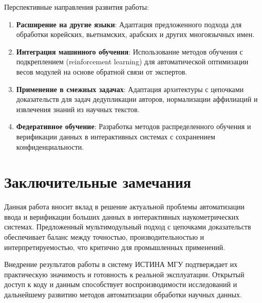 Перспективные направления развития работы:

\begin{enumerate}
    \item \textbf{Расширение на другие языки}: Адаптация предложенного подхода для обработки корейских, вьетнамских, арабских и других многоязычных имен.

    \item \textbf{Интеграция машинного обучения}: Использование методов обучения с подкреплением (reinforcement learning) для автоматической оптимизации весов модулей на основе обратной связи от экспертов.

    \item \textbf{Применение в смежных задачах}: Адаптация архитектуры с цепочками доказательств для задач дедупликации авторов, нормализации аффилиаций и извлечения знаний из научных текстов.

    \item \textbf{Федеративное обучение}: Разработка методов распределенного обучения и верификации данных в интерактивных системах с сохранением конфиденциальности.
\end{enumerate}

\section{Заключительные замечания}
\label{sec:concl:final}

Данная работа вносит вклад в решение актуальной проблемы автоматизации ввода и верификации больших данных в интерактивных наукометрических системах. Предложенный мультимодульный подход с цепочками доказательств обеспечивает баланс между точностью, производительностью и интерпретируемостью, что критично для промышленных применений.

Внедрение результатов работы в систему ИСТИНА МГУ подтверждает их практическую значимость и готовность к реальной эксплуатации. Открытый доступ к коду и данным способствует воспроизводимости исследований и дальнейшему развитию методов автоматизации обработки научных данных.
